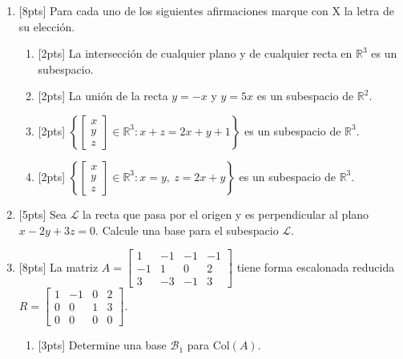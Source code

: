 \documentclass[11pt]{article}
\newcommand{\vf}{\fbox{V}\ \fbox{F}}
\begin{document}
\begin{enumerate}
\item{}[8pts] Para cada uno de los siguientes afirmaciones marque con X la letra de su elección.
\begin{enumerate}
\item{}[2pts] La intersección de cualquier plano y de cualquier recta en $\mathbb{R}^3$ es un subespacio. \hfill\vf

\item{}[2pts] La unión de la recta $y=-x$ y $y=5x$ es un subespacio de $\mathbb{R}^2$. \hfill\vf

\item{}[2pts] $\left\{\begin{bmatrix}x\\y\\z\end{bmatrix}\in\mathbb{R}^3: x+z=2x+y+1\right\}$ es un subespacio de $\mathbb{R}^3$. \hfill\vf

\item{}[2pts] $\left\{\begin{bmatrix}x\\y\\z\end{bmatrix}\in\mathbb{R}^3: x=y,\ z=2x+y\right\}$ es un subespacio de $\mathbb{R}^3$. \hfill\vf
\end{enumerate}

\item{}[5pts] Sea $\mathcal{L}$ la recta que pasa por el origen y es perpendicular al plano $x-2y+3z=0$. Calcule una base para el subespacio $\mathcal{L}$.

\vspace{4pt}

\item{}[8pts] La matriz $A = \begin{bmatrix}1&-1&-1&-1\\-1&1&0&2\\3&-3&-1&3\end{bmatrix}$ tiene forma escalonada reducida $R=\begin{bmatrix}1&-1&0&2\\0&0&1&3\\0&0&0&0\end{bmatrix}$.
\begin{enumerate}
\item{}[3pts] Determine una base $\mathcal{B}_1$ para $\mathrm{Col}(A)$.


\end{enumerate}
\end{enumerate}
\end{document}
